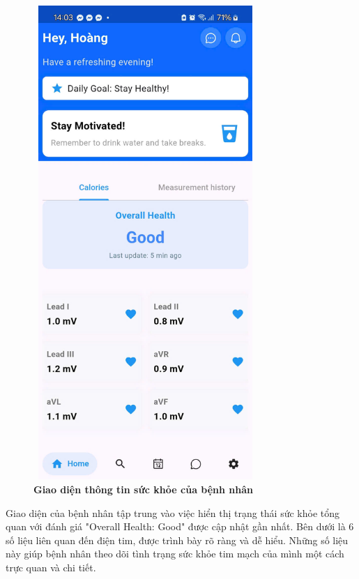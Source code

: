 \begin{figure}[H]
	\centering
	\includegraphics[width=8.5cm,height=18cm]{Images/AppUI/homePagePatient.jpg}
	\caption[Giao diện thông tin sức khỏe của bệnh nhân]{\bfseries \fontsize{12pt}{0pt}\selectfont Giao diện thông tin sức khỏe của bệnh nhân}
	\label{healthInfoPatient}
\end{figure}
Giao diện của bệnh nhân tập trung vào việc hiển thị trạng thái sức khỏe tổng quan với đánh giá "Overall Health: Good" được cập nhật gần nhất. Bên dưới là 6 số liệu liên quan đến điện tim, được trình bày rõ ràng và dễ hiểu. Những số liệu này giúp bệnh nhân theo dõi tình trạng sức khỏe tim mạch của mình một cách trực quan và chi tiết.



